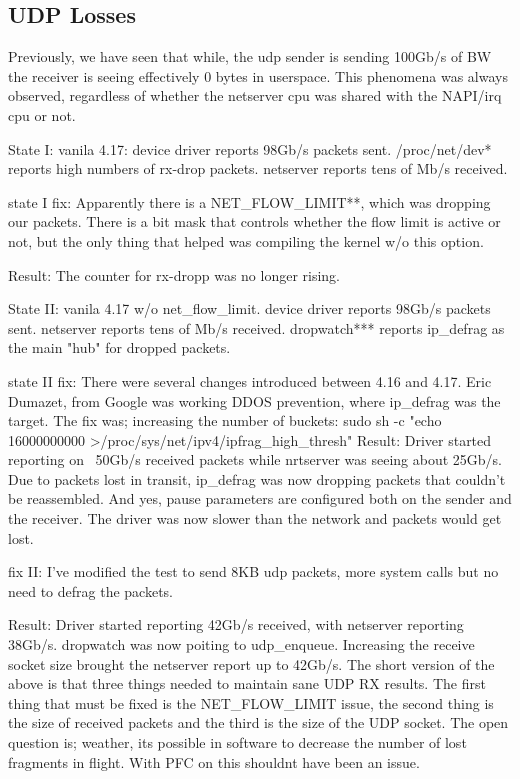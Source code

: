 \subsection{UDP Losses}
Previously, we have seen that while, the udp sender is sending 100Gb/s of BW the receiver is seeing effectively 0 bytes in userspace. This phenomena was always observed, regardless of whether the netserver cpu was shared with the NAPI/irq cpu or not.

State I:  vanila 4.17: 
device driver reports 98Gb/s packets sent.
/proc/net/dev* reports high numbers of rx-drop packets.
netserver reports tens of Mb/s received. 

state I fix: Apparently  there is  a NET\_FLOW\_LIMIT**, which was dropping our packets.
There is a bit mask that controls whether the flow limit is active or not, but the only thing that helped was compiling the kernel w/o this option.

Result: The counter for rx-dropp was no longer rising. 

State II: vanila 4.17 w/o net\_flow\_limit.
device driver reports 98Gb/s packets sent.
netserver reports tens of Mb/s received.
dropwatch*** reports ip\_defrag as the main "hub" for dropped packets.

state II fix: There were several changes introduced between 4.16 and 4.17. Eric Dumazet, from Google was working DDOS prevention, where ip\_defrag was the target.
The fix was; increasing the number of buckets:
sudo sh -c "echo 16000000000 >/proc/sys/net/ipv4/ipfrag\_high\_thresh"
Result: 
Driver started reporting on ~50Gb/s received packets while nrtserver was seeing about 25Gb/s. Due to packets lost in transit, ip\_defrag was now dropping packets that couldn't be reassembled. And yes, pause parameters are configured both on the sender and the receiver. The driver was now slower than the network and packets would get lost. 

fix II: I've modified the test to send 8KB udp packets, more system calls but no need to defrag the packets.

Result: Driver started reporting 42Gb/s received, with netserver reporting 38Gb/s.
dropwatch was now poiting to udp\_enqueue. Increasing the receive socket size
brought the netserver report up to 42Gb/s.
The short version of the above is that three things needed to maintain sane UDP RX results. The first thing that must be fixed is the NET\_FLOW\_LIMIT issue, the second thing is the size of received packets and the third is the size of the UDP socket.
The open question is; weather, its possible in software to decrease the number of lost fragments in flight. With PFC on this shouldnt have been an issue.

